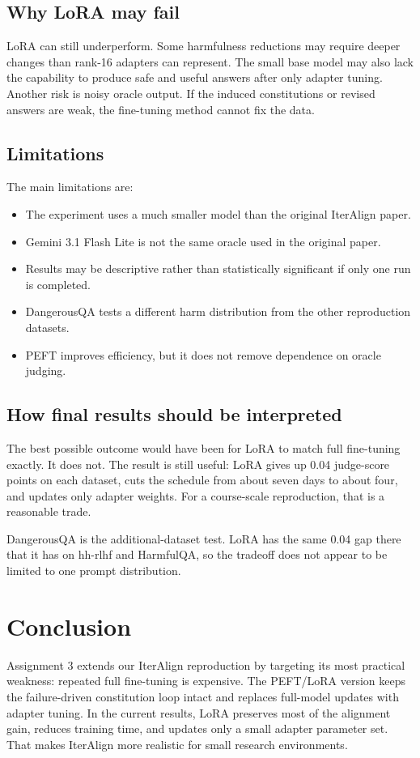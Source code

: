 \documentclass[11pt]{article}
\begin{document}
\subsection{Why LoRA may fail}
LoRA can still underperform. Some harmfulness reductions may require deeper changes than rank-16 adapters can represent. The small base model may also lack the capability to produce safe and useful answers after only adapter tuning. Another risk is noisy oracle output. If the induced constitutions or revised answers are weak, the fine-tuning method cannot fix the data.

\subsection{Limitations}
The main limitations are:
\begin{itemize}
  \item The experiment uses a much smaller model than the original IterAlign paper.
  \item Gemini 3.1 Flash Lite is not the same oracle used in the original paper.
  \item Results may be descriptive rather than statistically significant if only one run is completed.
  \item DangerousQA tests a different harm distribution from the other reproduction datasets.
  \item PEFT improves efficiency, but it does not remove dependence on oracle judging.
\end{itemize}

\subsection{How final results should be interpreted}
The best possible outcome would have been for LoRA to match full fine-tuning exactly. It does not. The result is still useful: LoRA gives up 0.04 judge-score points on each dataset, cuts the schedule from about seven days to about four, and updates only adapter weights. For a course-scale reproduction, that is a reasonable trade.

DangerousQA is the additional-dataset test. LoRA has the same 0.04 gap there that it has on hh-rlhf and HarmfulQA, so the tradeoff does not appear to be limited to one prompt distribution.

\section{Conclusion}
\label{sec:conclusion}

Assignment 3 extends our IterAlign reproduction by targeting its most practical weakness: repeated full fine-tuning is expensive. The PEFT/LoRA version keeps the failure-driven constitution loop intact and replaces full-model updates with adapter tuning. In the current results, LoRA preserves most of the alignment gain, reduces training time, and updates only a small adapter parameter set. That makes IterAlign more realistic for small research environments.



\end{document}
